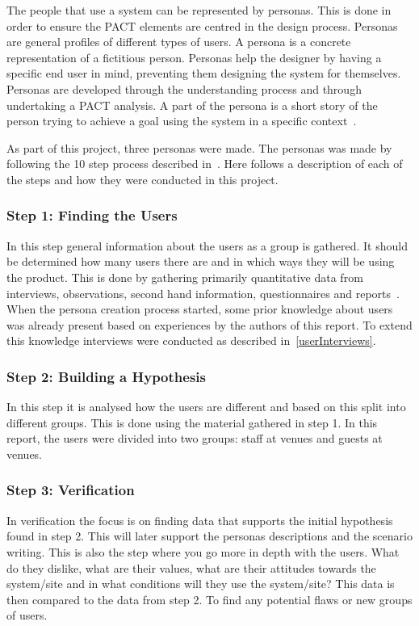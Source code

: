The people that use a system can be represented by personas. This is done in order to ensure the PACT elements are centred in the design process. Personas are general profiles of different types of users. A persona is a concrete representation of a fictitious person. Personas help the designer by having a specific end user in mind, preventing them designing the system for themselves. Personas are developed through the understanding process and through undertaking a PACT analysis. A part of the persona is a short story of the person trying to achieve a goal using the system in a specific context~\cite{benyon2013designing}.

As part of this project, three personas were made. The personas was made by following the 10 step process described in~\cite{nielsen2007persona}. Here follows a description of each of the steps and how they were conducted in this project.

\subsubsection{Step 1: Finding the Users}
In this step general information about the users as a group is gathered. It should be determined how many users there are and in which ways they will be using the product. This is done by gathering primarily quantitative data from interviews, observations, second hand information, questionnaires and reports~\cite{nielsen2007ten}. When the persona creation process started, some prior knowledge about users was already present based on experiences by the authors of this report. To extend this knowledge interviews were conducted as described in~\cref{userInterviews}.

\subsubsection{Step 2: Building a Hypothesis}
In this step it is analysed how the users are different and based on this split into different groups. This is done using the material gathered in step 1. In this report, the users were divided into two groups: staff at venues and guests at venues.

\subsubsection{Step 3: Verification}
In verification the focus is on finding data that supports the initial hypothesis found in step 2. This will later support the personas descriptions and the scenario writing. This is also the step where you go more in depth with the users. What do they dislike, what are their values, what are their attitudes towards the system/site and in what conditions will they use the system/site? This data is then compared to the data from step 2. To find any potential flaws or new groups of users.

